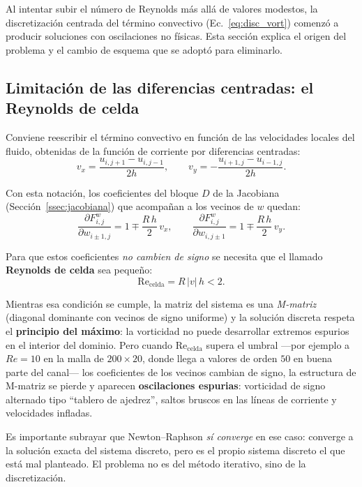 \documentclass[12pt, a4paper]{article}
\begin{document}
Al intentar subir el número de Reynolds más allá de valores modestos, la
discretización centrada del término convectivo (Ec.~\eqref{eq:disc_vort})
comenzó a producir soluciones con oscilaciones no físicas. Esta sección
explica el origen del problema y el cambio de esquema que se adoptó para
eliminarlo.

\subsection{Limitación de las diferencias centradas: el Reynolds de celda}

Conviene reescribir el término convectivo en función de las velocidades
locales del fluido, obtenidas de la función de corriente por diferencias
centradas:
\begin{equation}
  v_x = \frac{u_{i,j+1} - u_{i,j-1}}{2h}, \qquad
  v_y = -\frac{u_{i+1,j} - u_{i-1,j}}{2h}.
\end{equation}

Con esta notación, los coeficientes del bloque $D$ de la Jacobiana
(Sección~\ref{ssec:jacobiana}) que acompañan a los vecinos de $w$ quedan:
\begin{equation}
  \frac{\partial F^{w}_{i,j}}{\partial w_{i\pm1,j}}
    = 1 \mp \frac{R\,h}{2}\,v_x, \qquad
  \frac{\partial F^{w}_{i,j}}{\partial w_{i,j\pm1}}
    = 1 \mp \frac{R\,h}{2}\,v_y.
\end{equation}

Para que estos coeficientes \emph{no cambien de signo} se necesita que el
llamado \textbf{Reynolds de celda} sea pequeño:
\begin{equation}
  \mathrm{Re}_{\text{celda}} = R\,|v|\,h < 2.
\end{equation}

Mientras esa condición se cumple, la matriz del sistema es una
\emph{M-matriz} (diagonal dominante con vecinos de signo uniforme) y la
solución discreta respeta el \textbf{principio del máximo}: la vorticidad no
puede desarrollar extremos espurios en el interior del dominio. Pero cuando
$\mathrm{Re}_{\text{celda}}$ supera el umbral —por ejemplo a $Re = 10$ en la
malla de $200\times20$, donde llega a valores de orden $50$ en buena parte
del canal— los coeficientes de los vecinos cambian de signo, la estructura de
M-matriz se pierde y aparecen \textbf{oscilaciones espurias}: vorticidad de
signo alternado tipo ``tablero de ajedrez'', saltos bruscos en las líneas de
corriente y velocidades infladas.

Es importante subrayar que Newton--Raphson \emph{sí converge} en ese caso:
converge a la solución exacta del sistema discreto, pero es el propio sistema
discreto el que está mal planteado. El problema no es del método iterativo,
sino de la discretización.
\end{document}
